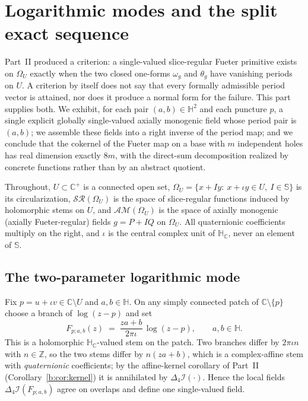 \documentclass[11pt,a4paper]{article}
\numberwithin{equation}{section}
\theoremstyle{definition}
\theoremstyle{remark}
\theoremstyle{plain}
\newcommand{\HH}{\mathbb H}
\newcommand{\HC}{\mathbb H_{\mathbb C}}
\newcommand{\CC}{\mathbb C}
\newcommand{\ZZ}{\mathbb Z}
\newcommand{\SSS}{\mathbb S}
\newcommand{\Cplus}{\CC^{+}}
\newcommand{\lap}{\Delta_4}
\newcommand{\I}{\mathcal I}
\newcommand{\SR}{\mathcal{SR}}
\newcommand{\AM}{\mathcal{AM}}
\newcommand{\Om}{\Omega}
\newcommand{\om}{\omega}
\newcommand{\thet}{\theta}
\begin{document}


\section{Logarithmic modes and the split exact sequence}
\label{c:sec:modes}

Part~II produced a criterion: a single-valued slice-regular Fueter
primitive exists on $\Om_U$ exactly when the two closed one-forms
$\om_g$ and $\thet_g$ have vanishing periods on $U$.  A criterion by
itself does not say that every formally admissible period vector is
attained, nor does it produce a normal form for the failure.  This part
supplies both.  We exhibit, for each pair $(a,b)\in\HH^2$ and each
puncture $p$, a single explicit globally single-valued axially monogenic
field whose period pair is $(a,b)$; we assemble these fields into a right
inverse of the period map; and we conclude that the cokernel of the
Fueter map on a base with $m$ independent holes has real dimension
exactly $8m$, with the direct-sum decomposition realized by concrete
functions rather than by an abstract quotient.

Throughout, $U\subset\Cplus$ is a connected open set,
$\Om_U=\{x+Iy:\ x+\iota y\in U,\ I\in\SSS\}$ is its circularization,
$\SR(\Om_U)$ is the space of slice-regular functions induced by
holomorphic stems on $U$, and $\AM(\Om_U)$ is the space of axially
monogenic (axially Fueter-regular) fields $g=P+IQ$ on $\Om_U$.  All
quaternionic coefficients multiply on the right, and $\iota$ is the
central complex unit of $\HC$, never an element of $\SSS$.

\subsection{The two-parameter logarithmic mode}

Fix $p=u+\iota v\in\CC\setminus U$ and $a,b\in\HH$.  On any simply
connected patch of $\CC\setminus\{p\}$ choose a branch of $\log(z-p)$
and set
\begin{equation}
  F_{p;a,b}(z)\;=\;\frac{za+b}{2\pi\iota}\,\log(z-p),
  \qquad a,b\in\HH .
  \label{c:eq:logstem}
\end{equation}
This is a holomorphic $\HC$-valued stem on the patch.  Two branches
differ by $2\pi\iota n$ with $n\in\ZZ$, so the two stems differ by
$n(za+b)$, which is a complex-affine stem with \emph{quaternionic}
coefficients; by the affine-kernel corollary of Part~II (Corollary~\ref{b:cor:kernel}) it is annihilated by $\lap\I(\cdot)$.  Hence the local fields $\lap\I(F_{p;a,b})$ agree on
overlaps and define one single-valued field.
\end{document}
